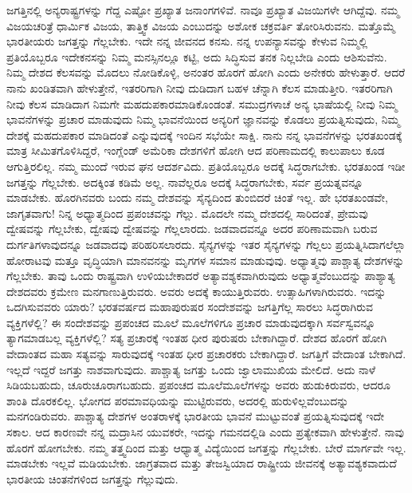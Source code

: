 ಜಗತ್ತಿನಲ್ಲಿ ಅನ್ಯರಾಷ್ಟ್ರಗಳನ್ನು ಗೆದ್ದ ಎಷ್ಟೋ ಪ್ರಖ್ಯಾತ ಜನಾಂಗಗಳಿವೆ. ನಾವೂ ಪ್ರಖ್ಯಾತ ವಿಜಯಿಗಳೇ ಆಗಿದ್ದೆವು. ನಮ್ಮ ವಿಜಯಚರಿತ್ರೆ ಧಾರ್ಮಿಕ ವಿಜಯ, ತಾತ್ತ್ವಿಕ ವಿಜಯ ಎಂಬುದನ್ನು ಅಶೋಕ ಚಕ್ರವರ್ತಿ ತೋರಿಸಿರುವನು. ಮತ್ತೊಮ್ಮೆ ಭಾರತೀಯರು ಜಗತ್ತನ್ನು ಗೆಲ್ಲಬೇಕು. ಇದೇ ನನ್ನ ಜೀವನದ ಕನಸು. ನನ್ನ ಉಪನ್ಯಾಸವನ್ನು ಕೇಳುವ ನಿಮ್ಮಲ್ಲಿ ಪ್ರತಿಯೊಬ್ಬರೂ ಇದೇ\break ಕನಸನ್ನು ನಿಮ್ಮ ಮನಸ್ಸಿನಲ್ಲೂ ಕಟ್ಟಿ, ಅದು ಸಿದ್ಧಿಸುವ ತನಕ ನಿಲ್ಲಬೇಡಿ ಎಂದು ಆಶಿಸುವೆನು. ನಿಮ್ಮ ದೇಶದ ಕೆಲಸವನ್ನು ಮೊದಲು ನೋಡಿಕೊಳ್ಳಿ, ಅನಂತರ ಹೊರಗೆ ಹೋಗಿ ಎಂದು ಅನೇಕರು ಹೇಳುತ್ತಾರೆ. ಆದರೆ ನಾನು ಖಂಡಿತವಾಗಿ ಹೇಳುತ್ತೇನೆ, ಇತರರಿಗಾಗಿ ನೀವು ದುಡಿದಾಗ ಬಹಳ ಚೆನ್ನಾಗಿ ಕೆಲಸ ಮಾಡುತ್ತೀರಿ. ಇತರರಿಗಾಗಿ ನೀವು ಕೆಲಸ ಮಾಡಿದಾಗ ನಿಮಗೇ ಮಹದುಪಕಾರಮಾಡಿಕೊಂಡಂತೆ. ಸಮುದ್ರಗಳಾಚೆ ಅನ್ಯ ಭಾಷೆಯಲ್ಲಿ ನೀವು ನಿಮ್ಮ ಭಾವನೆಗಳನ್ನು ಪ್ರಚಾರ ಮಾಡುವುದು ನಿಮ್ಮ ಭಾವನೆಯಿಂದ ಅನ್ಯರಿಗೆ ಜ್ಞಾನವನ್ನು ಕೊಡಲು ಪ್ರಯತ್ನಿಸುವುದು, ನಿಮ್ಮ ದೇಶಕ್ಕೆ ಮಹದುಪಕಾರ ಮಾಡಿದಂತೆ ಎನ್ನುವುದಕ್ಕೆ ಇಂದಿನ ಸಭೆಯೇ ಸಾಕ್ಷಿ. ನಾನು ನನ್ನ ಭಾವನೆಗಳನ್ನು ಭರತಖಂಡಕ್ಕೆ ಮಾತ್ರ ಸೀಮಿತಗೊಳಿಸಿದ್ದರೆ, ಇಂಗ್ಲೆಂಡ್​ ಅಮೆರಿಕಾ ದೇಶಗಳಿಗೆ ಹೋಗಿ ಆದ ಪರಿಣಾಮದಲ್ಲಿ ಕಾಲುಪಾಲು ಕೂಡ ಆಗುತ್ತಿರಲಿಲ್ಲ. ನಮ್ಮ ಮುಂದೆ ಇರುವ ಘನ ಆದರ್ಶವಿದು. ಪ್ರತಿಯೊಬ್ಬರೂ ಅದಕ್ಕೆ ಸಿದ್ಧರಾಗಬೇಕು. ಭರತಖಂಡ ಇಡೀ ಜಗತ್ತನ್ನು ಗೆಲ್ಲಬೇಕು. ಅದಕ್ಕಿಂತ ಕಡಿಮೆ ಅಲ್ಲ. ನಾವೆಲ್ಲರೂ ಅದಕ್ಕೆ ಸಿದ್ಧರಾಗಬೇಕು, ಸರ್ವ ಪ್ರಯತ್ನವನ್ನೂ ಮಾಡಬೇಕು. ಹೊರಗಿನವರು ಬಂದು ನಮ್ಮ ದೇಶವನ್ನು ಸೈನ್ಯದಿಂದ ತುಂಬಿದರೆ ಚಿಂತೆ ಇಲ್ಲ. ಹೇ ಭರತಖಂಡವೇ, ಜಾಗೃತವಾಗು! ನಿನ್ನ ಅಧ್ಯಾತ್ಮದಿಂದ ಪ್ರಪಂಚವನ್ನು ಗೆಲ್ಲು. ಮೊದಲೇ ನಮ್ಮ ದೇಶದಲ್ಲಿ ಸಾರಿದಂತೆ, ಪ್ರೇಮವು ದ್ವೇಷವನ್ನು ಗೆಲ್ಲಬೇಕು, ದ್ವೇಷವು ದ್ವೇಷವನ್ನು ಗೆಲ್ಲಲಾರದು. ಜಡವಾದವನ್ನೂ ಅದರ ಪರಿಣಾಮವಾಗಿ ಬರುವ ದುರ್ಗತಿಗಳಾವುದನ್ನೂ ಜಡವಾದವು ಪರಿಹರಿಸಲಾರದು. ಸೈನ್ಯಗಳನ್ನು ಇತರ ಸೈನ್ಯಗಳನ್ನು ಗೆಲ್ಲಲು ಪ್ರಯತ್ನಿಸಿದಾಗಲೆಲ್ಲಾ ಹೋರಾಟವು ಮತ್ತೂ ವೃದ್ಧಿಯಾಗಿ ಮಾನವನನ್ನು ಮೃಗಗಳ ಸಮಾನ ಮಾಡುವುವು. ಅಧ್ಯಾತ್ಮವು ಪಾಶ್ಚಾತ್ಯ ದೇಶಗಳನ್ನು ಗೆಲ್ಲಬೇಕು. ತಾವು ಒಂದು ರಾಷ್ಟ್ರವಾಗಿ ಉಳಿಯಬೇಕಾದರೆ ಅತ್ಯಾವಶ್ಯಕವಾಗಿರುವುದು ಅಧ್ಯಾತ್ಮವೆಂಬುದನ್ನು ಪಾಶ್ಯಾತ್ಯ ದೇಶದವರು ಕ್ರಮೇಣ ಮನಗಾಣುತ್ತಿರುವರು. ಅವರು ಅದಕ್ಕೆ ಕಾಯುತ್ತಿರುವರು. ಉತ್ಸಾಹಿಗಳಾಗಿರುವರು. ಇದನ್ನು ಒದಗಿಸುವವರು ಯಾರು? ಭರತವರ್ಷದ ಮಹಾಪುರುಷರ ಸಂದೇಶವನ್ನು ಜಗತ್ತಿಗೆಲ್ಲ ಸಾರಲು ಸಿದ್ಧರಾಗಿರುವ ವ್ಯಕ್ತಿಗಳೆಲ್ಲಿ? ಈ ಸಂದೇಶವನ್ನು ಪ್ರಪಂಚದ ಮೂಲೆ ಮೂಲೆಗಳಿಗೂ ಪ್ರಚಾರ ಮಾಡುವುದಕ್ಕಾಗಿ ಸರ್ವಸ್ವವನ್ನೂ ತ್ಯಾಗಮಾಡಬಲ್ಲ ವ್ಯಕ್ತಿಗಳೆಲ್ಲಿ? ಸತ್ಯ ಪ್ರಚಾರಕ್ಕೆ ಇಂತಹ ಧೀರ ಪುರುಷರು ಬೇಕಾಗಿದ್ದಾರೆ. ದೇಶದ ಹೊರಗೆ ಹೋಗಿ ವೇದಾಂತದ ಮಹಾ ಸತ್ಯವನ್ನು ಸಾರುವುದಕ್ಕೆ ಇಂತಹ ಧೀರ ಪ್ರಚಾರಕರು ಬೇಕಾಗಿದ್ದಾರೆ. ಜಗತ್ತಿಗೆ ವೇದಾಂತ ಬೇಕಾಗಿದೆ. ಇಲ್ಲದೆ ಇದ್ದರೆ ಜಗತ್ತು ನಾಶವಾಗುವುದು. ಪಾಶ್ಚಾತ್ಯ ಜಗತ್ತು ಒಂದು ಜ್ವಾಲಾಮುಖಿಯ ಮೇಲಿದೆ. ಅದು ನಾಳೆ ಸಿಡಿಯಬಹುದು, ಚೂರುಚೂರಾಗಬಹುದು. ಪ್ರಪಂಚದ ಮೂಲೆಮೂಲೆಗಳನ್ನು ಅವರು ಹುಡುಕಿರುವರು, ಆದರೂ ಶಾಂತಿ ದೊರಕಲಿಲ್ಲ. ಭೋಗದ ಪರಮಾವಧಿಯನ್ನು ಮುಟ್ಟಿರುವರು, ಅದರಲ್ಲಿ ಹುರುಳಿಲ್ಲವೆಂಬುದನ್ನು ಮನಗಂಡಿರುವರು. ಪಾಶ್ಚಾತ್ಯ ದೇಶಗಳ ಅಂತರಾಳಕ್ಕೆ ಭಾರತೀಯ ಭಾವನೆ ಮುಟ್ಟುವಂತೆ ಪ್ರಯತ್ನಿಸುವುದಕ್ಕೆ ಇದೇ ಸಕಾಲ. ಆದ ಕಾರಣವೇ ನನ್ನ ಮದ್ರಾಸಿನ ಯುವಕರೇ, ಇದನ್ನು ಗಮನದಲ್ಲಿಡಿ ಎಂದು ಪ್ರತ್ಯೇಕವಾಗಿ ಹೇಳುತ್ತೇನೆ. ನಾವು ಹೊರಗೆ ಹೋಗಬೇಕು. ನಮ್ಮ ತತ್ತ್ವದಿಂದ ಮತ್ತು ಆಧ್ಯಾತ್ಮ ವಿದ್ಯೆಯಿಂದ ಜಗತ್ತನ್ನು ಗೆಲ್ಲಬೇಕು. ಬೇರೆ ಮಾರ್ಗವೇ ಇಲ್ಲ. ಮಾಡಬೇಕು ಇಲ್ಲವೆ ಮಡಿಯಬೇಕು. ಜಾಗ್ರತವಾದ ಮತ್ತು ತೇಜಸ್ವಿಯಾದ ರಾಷ್ಟ್ರೀಯ ಜೀವನಕ್ಕೆ ಅತ್ಯಾವಶ್ಯಕವಾದುದೆ ಭಾರತೀಯ ಚಿಂತನೆಗಳಿಂದ ಜಗತ್ತನ್ನು ಗೆಲ್ಲುವುದು.

